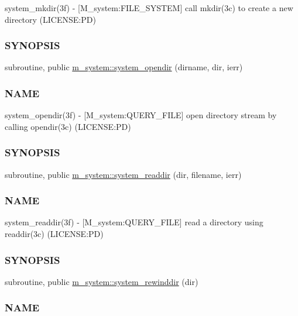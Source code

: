 \begin{DoxyCompactItemize}
\begin{DoxyCompactList}
system\+\_\+mkdir(3f) -\/ \mbox{[}M\+\_\+system\+:F\+I\+L\+E\+\_\+\+S\+Y\+S\+T\+EM\mbox{]} call mkdir(3c) to create a new directory (L\+I\+C\+E\+N\+SE\+:PD) \subsubsection*{S\+Y\+N\+O\+P\+S\+IS}\end{DoxyCompactList}\item 
subroutine, public \mbox{\hyperlink{namespacem__system_a622cc67c03e8cdea1d4c2430bb36081b}{m\+\_\+system\+::system\+\_\+opendir}} (dirname, dir, ierr)
\begin{DoxyCompactList}\small\item\em \subsubsection*{N\+A\+ME}

system\+\_\+opendir(3f) -\/ \mbox{[}M\+\_\+system\+:Q\+U\+E\+R\+Y\+\_\+\+F\+I\+LE\mbox{]} open directory stream by calling opendir(3c) (L\+I\+C\+E\+N\+SE\+:PD) \subsubsection*{S\+Y\+N\+O\+P\+S\+IS}\end{DoxyCompactList}\item 
subroutine, public \mbox{\hyperlink{namespacem__system_a983df5b2d7cb5842d69c4a31829403e0}{m\+\_\+system\+::system\+\_\+readdir}} (dir, filename, ierr)
\begin{DoxyCompactList}\small\item\em \subsubsection*{N\+A\+ME}

system\+\_\+readdir(3f) -\/ \mbox{[}M\+\_\+system\+:Q\+U\+E\+R\+Y\+\_\+\+F\+I\+LE\mbox{]} read a directory using readdir(3c) (L\+I\+C\+E\+N\+SE\+:PD) \subsubsection*{S\+Y\+N\+O\+P\+S\+IS}\end{DoxyCompactList}\item 
subroutine, public \mbox{\hyperlink{namespacem__system_a3ffe757195ade8052e8acabd196ee3ca}{m\+\_\+system\+::system\+\_\+rewinddir}} (dir)
\begin{DoxyCompactList}\small\item\em \subsubsection*{N\+A\+ME}


\end{DoxyCompactList}
\end{DoxyCompactItemize}
